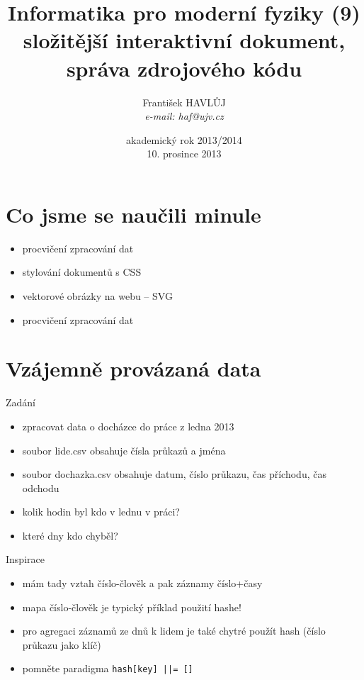\documentclass{beamer}
\title[IMF (10)]{Informatika pro moderní fyziky (9)\\ složitější interaktivní dokument, správa zdrojového kódu}
\author[Franti\v{s}ek HAVL\r{U}J, ORF ÚJV Řež]{Franti\v{s}ek HAVL\r{U}J\\{\scriptsize \emph{e-mail: haf@ujv.cz}}}
\date{akademický rok 2013/2014\\10. prosince 2013}
\institute[ORF ÚJV Řež]
{ÚJV Řež\\oddělení Reaktorové fyziky a podpory palivového cyklu}
\begin{document}
\begin{frame}
  \titlepage
\end{frame}

\begin{frame}
  \tableofcontents
\end{frame}

\section{Co jsme se naučili minule}

\begin{frame}{}
  \begin{itemize}
    \item procvičení zpracování dat
    \item stylování dokumentů s CSS
    \item vektorové obrázky na webu -- SVG
    \item procvičení zpracování dat
  \end{itemize}
\end{frame}

\section{Vzájemně provázaná data}

\begin{frame}{Zadání}
  \begin{itemize}
    \item zpracovat data o docházce do práce z ledna 2013
    \item soubor lide.csv obsahuje čísla průkazů a jména
    \item soubor dochazka.csv obsahuje datum, číslo průkazu, čas příchodu, čas odchodu
    \item kolik hodin byl kdo v lednu v práci?
    \item které dny kdo chyběl?
  \end{itemize}
\end{frame}

\begin{frame}{Inspirace}
  \begin{itemize}
    \item mám tady vztah číslo-člověk a pak záznamy číslo+časy
    \item mapa číslo-člověk je typický příklad použití hashe!
    \item pro agregaci záznamů ze dnů k lidem je také chytré použít hash (číslo průkazu jako klíč)
    \item pomněte paradigma \texttt{hash[key] ||= []}
  \end{itemize}
\end{frame}
\end{document}
